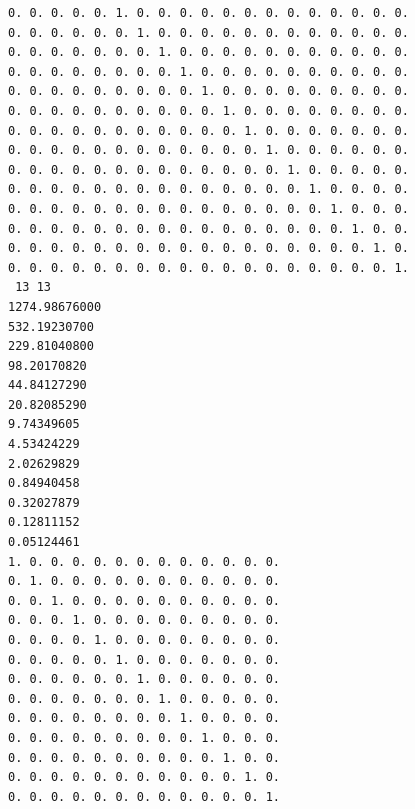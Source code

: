 \documentclass[a4paper,fleqn]{article}
\begin{document}
\begin{verbatim}
0. 0. 0. 0. 0. 1. 0. 0. 0. 0. 0. 0. 0. 0. 0. 0. 0. 0. 0. 
0. 0. 0. 0. 0. 0. 1. 0. 0. 0. 0. 0. 0. 0. 0. 0. 0. 0. 0. 
0. 0. 0. 0. 0. 0. 0. 1. 0. 0. 0. 0. 0. 0. 0. 0. 0. 0. 0. 
0. 0. 0. 0. 0. 0. 0. 0. 1. 0. 0. 0. 0. 0. 0. 0. 0. 0. 0. 
0. 0. 0. 0. 0. 0. 0. 0. 0. 1. 0. 0. 0. 0. 0. 0. 0. 0. 0. 
0. 0. 0. 0. 0. 0. 0. 0. 0. 0. 1. 0. 0. 0. 0. 0. 0. 0. 0. 
0. 0. 0. 0. 0. 0. 0. 0. 0. 0. 0. 1. 0. 0. 0. 0. 0. 0. 0. 
0. 0. 0. 0. 0. 0. 0. 0. 0. 0. 0. 0. 1. 0. 0. 0. 0. 0. 0. 
0. 0. 0. 0. 0. 0. 0. 0. 0. 0. 0. 0. 0. 1. 0. 0. 0. 0. 0. 
0. 0. 0. 0. 0. 0. 0. 0. 0. 0. 0. 0. 0. 0. 1. 0. 0. 0. 0. 
0. 0. 0. 0. 0. 0. 0. 0. 0. 0. 0. 0. 0. 0. 0. 1. 0. 0. 0. 
0. 0. 0. 0. 0. 0. 0. 0. 0. 0. 0. 0. 0. 0. 0. 0. 1. 0. 0. 
0. 0. 0. 0. 0. 0. 0. 0. 0. 0. 0. 0. 0. 0. 0. 0. 0. 1. 0. 
0. 0. 0. 0. 0. 0. 0. 0. 0. 0. 0. 0. 0. 0. 0. 0. 0. 0. 1. 
 13 13
1274.98676000
532.19230700
229.81040800
98.20170820
44.84127290
20.82085290
9.74349605
4.53424229
2.02629829
0.84940458
0.32027879
0.12811152
0.05124461
1. 0. 0. 0. 0. 0. 0. 0. 0. 0. 0. 0. 0. 
0. 1. 0. 0. 0. 0. 0. 0. 0. 0. 0. 0. 0. 
0. 0. 1. 0. 0. 0. 0. 0. 0. 0. 0. 0. 0. 
0. 0. 0. 1. 0. 0. 0. 0. 0. 0. 0. 0. 0. 
0. 0. 0. 0. 1. 0. 0. 0. 0. 0. 0. 0. 0. 
0. 0. 0. 0. 0. 1. 0. 0. 0. 0. 0. 0. 0. 
0. 0. 0. 0. 0. 0. 1. 0. 0. 0. 0. 0. 0. 
0. 0. 0. 0. 0. 0. 0. 1. 0. 0. 0. 0. 0. 
0. 0. 0. 0. 0. 0. 0. 0. 1. 0. 0. 0. 0. 
0. 0. 0. 0. 0. 0. 0. 0. 0. 1. 0. 0. 0. 
0. 0. 0. 0. 0. 0. 0. 0. 0. 0. 1. 0. 0. 
0. 0. 0. 0. 0. 0. 0. 0. 0. 0. 0. 1. 0. 
0. 0. 0. 0. 0. 0. 0. 0. 0. 0. 0. 0. 1. 
\end{verbatim}
\end{document}
